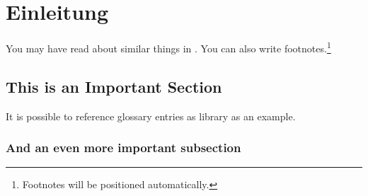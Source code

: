 \chapter{Einleitung}\label{ch:intro}

You may have read about similar things in \cite{Goodliffe2007}.
You can also write footnotes.\footnote{Footnotes will be positioned automatically.}
\blindtext

\blindtext

\section{This is an Important Section}

It is possible to reference glossary entries as \gls{library} as an example.
\blindtext

\subsection{And an even more important subsection}
\blindtext
